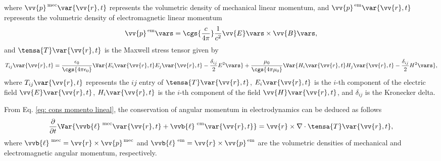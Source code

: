 where $\vv{p}^{\rm \, mec}\var{\vv{r},t}$ represents the volumetric density of mechanical linear momentum, and $\vv{p}^{\rm \, em}\var{\vv{r},t}$ represents the volumetric density of electromagnetic linear momentum
\begin{equation}
\vv{p}^{\rm \, em}\vars = \cgs{\frac{c}{4\pi}}\frac{1}{c^2}\vv{E}\vars\times\vv{B}\vars,
\end{equation}
and $\tensa{T}\var{\vv{r},t}$ is the Maxwell stress tensor given by \cite{jackson}
\begin{equation}
T_{ij}\var{\vv{r},t}= \frac{\epsilon_0}{\cgs{4\pi\epsilon_0}} \Var{E_i\var{\vv{r},t}E_j\var{\vv{r},t} -\frac{\delta_{ij}}{2}E^2\vars} +  \frac{\mu_0}{\cgs{4\pi\mu_0}} \Var{ H_i\var{\vv{r},t}H_j\var{\vv{r},t} -\frac{\delta_{ij}}{2}H^2\vars } ,
\end{equation}
where $T_{ij}\var{\vv{r},t}$ represents the $ij$ entry of $\tensa{T}\var{\vv{r},t}$, $E_i\var{\vv{r},t}$ is the $i$-th component of the electric field $\vv{E}\var{\vv{r},t}$, $H_i\var{\vv{r},t}$ is the $i$-th component of the field $\vv{H}\var{\vv{r},t}$, and $\delta_{ij}$ is the Kronecker delta.

From Eq. \eqref{eq: cons momento lineal}, the conservation of angular momentum in electrodynamics can be deduced as follows
\begin{equation}
\frac{\partial}{\partial t} \Var{\vvb{\ell}^{\rm \, \,mec}\var{\vv{r},t}+\vvb{\ell}^{\rm \, \,em}\var{\vv{r},t}} = \vv{r}\times\nabla \cdot \tensa{T}\var{\vv{r},t},
\label{Eq: r cross P}
\end{equation}
where $\vvb{\ell}^{\rm \, \,mec}=\vv{r}\times\vv{p}^{\rm \, mec}$ and $\vvb{\ell}^{\rm \, \,em}=\vv{r}\times\vv{p}^{\rm \, em}$ are the volumetric densities of mechanical and electromagnetic angular momentum, respectively.

